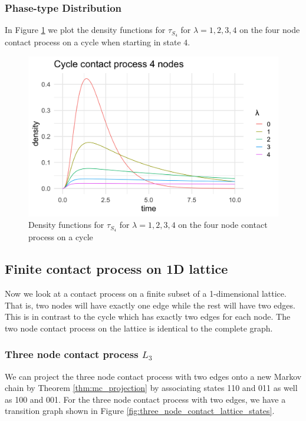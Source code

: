 \subsubsection{Phase-type Distribution}

In Figure \ref{fig:contact_4_cycle_phase_densities} we plot the density functions for $\tau_{S_4}$ for $\lambda = 1, 2, 3, 4$ on the four node contact process on a cycle when starting in state $4$.

\begin{figure}[H]
  \centering
    \includegraphics[width=.80\textwidth]{figures/cycle_4_contact_phase_densities.png}
   \caption{Density functions for $\tau_{S_4}$ for $\lambda = 1, 2, 3, 4$ on the four node contact process on a cycle}
  \label{fig:contact_4_cycle_phase_densities}
\end{figure}

\subsection{Finite contact process on 1D lattice}

Now we look at a contact process on a finite subset of a 1-dimensional lattice.
That is, two nodes will have exactly one edge while the rest will have two edges.
This is in contrast to the cycle which has exactly two edges for each node.
The two node contact process on the lattice is identical to the complete graph.

\subsubsection{Three node contact process \texorpdfstring{$L_3$}{L3}}
We can project the three node contact process with two edges onto a new Markov chain by Theorem \ref{thm:mc_projection} by associating states 110 and 011 as well as 100 and 001.
For the three node contact process with two edges, we have a transition graph shown in Figure \ref{fig:three_node_contact_lattice_states}.

